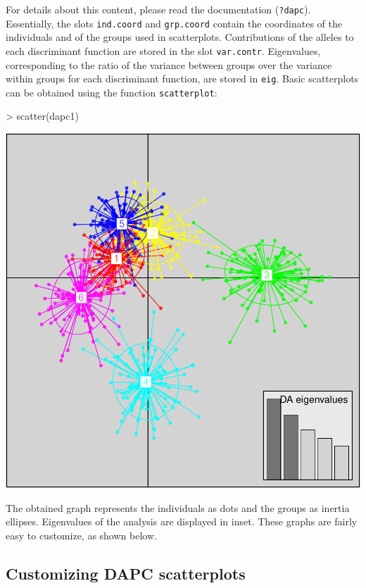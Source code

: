 \documentclass{article}
\begin{document}
For details about this content, please read the documentation (\texttt{?dapc}).
Essentially, the slots \texttt{ind.coord} and \texttt{grp.coord} contain the coordinates of the
individuals and of the groups used in scatterplots.
Contributions of the alleles to each discriminant function are stored in the slot \texttt{var.contr}.
Eigenvalues, corresponding to the ratio of the variance between groups over the variance within
groups for each discriminant function, are stored in \texttt{eig}.
Basic scatterplots can be obtained using the function \texttt{scatterplot}:
\begin{Schunk}
\begin{Sinput}
> scatter(dapc1)
\end{Sinput}
\end{Schunk}
\includegraphics{figs/dapc-010}

\noindent The obtained graph represents the individuals as dots and the groups as inertia
ellipses. Eigenvalues of the analysis are displayed in inset. These graphs are fairly easy to
customize, as shown below.




\subsection{Customizing DAPC scatterplots}
\end{document}
